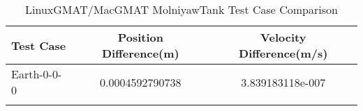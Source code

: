\begin{table}[htbp!]
\centering
\caption{ LinuxGMAT/MacGMAT MolniyawTank Test Case Comparison}
      \begin{tabular}{lcc}
      \hline\hline
          Test Case & Position Difference(m) & Velocity Difference(m/s) \\
         \hline
         Earth-0-0-0 & 0.0004592790738 & 3.839183118e-007 \\
      \hline\hline
      \label{Table: MolniyawTank LinuxGMAT-MacGMAT Table} 
\end{tabular}
\end{table}
